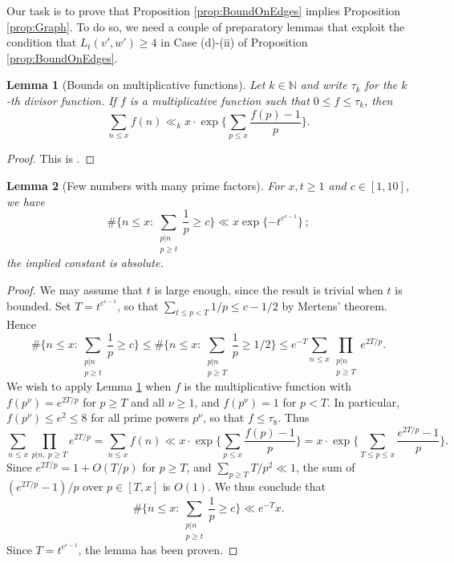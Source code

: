 \documentclass[12pt]{amsart}
\numberwithin{equation}{section}
\newtheorem{lem}{Lemma}[section]
\theoremstyle{definition}
\theoremstyle{remark}
\newcommand{\N}{\mathbb{N}}
\renewcommand{\le}{\leqslant}
\renewcommand{\ge}{\geqslant}
\begin{document}
Our task is to prove that Proposition \ref{prop:BoundOnEdges} implies Proposition \ref{prop:Graph}. To do so, we need a couple of preparatory lemmas that exploit the condition that $L_t(v',w')
\ge4$ in Case (d)-(ii) of Proposition \ref{prop:BoundOnEdges}.



\begin{lem}[Bounds on multiplicative functions]\label{lem:Tenenbaum}
	Let $k\in\N$ and write $\tau_k$ for the $k$-th divisor function. If $f$ is a multiplicative function such that $0\le f\le \tau_k$, then
	\[
	\sum_{n\le x} f(n) \ll_k x \cdot \exp\Big\{\sum_{p\le x}\frac{f(p)-1}{p}\Big\} .
	\]
\end{lem}
\begin{proof}
This is \cite[Theorem 14.2, p. 145]{dk-book}.
\end{proof}


\begin{lem}[Few numbers with many prime factors]\label{lem:Anatomy}
	For $x,t\ge1$ and $c\in[1,10]$, we have
	\[
	\#\bigg\{n\le x: \sum_{\substack{p|n\\  p\ge t}}\frac{1}{p} \ge  c \bigg\} \ll x\exp\{ - t^{e^{c-1}}\}  \, ;
	\]
	the implied constant is absolute.
\end{lem}

\begin{proof} We may assume that $t$ is large enough, since the result is trivial when $t$ is bounded. Set $T=t^{e^{c-1}}$, so that $\sum_{t\le p<T}1/p \le c-1/2$ by Mertens' theorem. Hence 
	\begin{equation}
	\#\bigg\{n\le x:\sum_{\substack{p|n\\ p\ge t}}\frac{1}{p} \ge c \bigg\}	
	\le \#\bigg\{n\le x: \sum_{\substack{p|n\\ p\ge T}}\frac{1}{p}  \ge 1/2 \bigg\} 
	\le e^{-T} \sum_{n\le x} \prod_{\substack{p|n\\ p\ge T}} e^{2T/p}  .
	\label{eq:Rankin}
	\end{equation}
	We wish to apply Lemma \ref{lem:Tenenbaum} when $f$ is the multiplicative function with $f(p^\nu)=e^{2T/p}$ for $p\ge T$ and all $\nu\ge 1$, and $f(p^\nu)=1$ for $p<T$. In particular, $f(p^\nu)\le e^2\le 8$ for all prime powers $p^\nu$, so that $f\le \tau_8$. Thus 
	\[
	\sum_{n\le x} \prod_{p|n,\ p\ge T} e^{2T/p}  
	= \sum_{n\le x} f(n) 
	\ll x \cdot \exp\Big\{\sum_{p\le x} \frac{f(p)-1}{p}\Big\} 
	=  x \cdot \exp\Big\{\sum_{T\le p\le x} \frac{e^{2T/p}-1}{p}\Big\} .
	\]
Since $e^{2T/p}=1+O(T/p)$ for $p\ge T$, and $\sum_{p\ge T} T/p^2\ll1$, the sum of $(e^{2T/p}-1)/p$ over $p\in[T,x]$ is $O(1)$. We thus conclude that
	\[
	\#\Big\{n\le x:\sum_{\substack{p|n\\ p\ge t}}\frac{1}{p} \ge c \Big\}\ll e^{-T}x.
	\]
Since $T=t^{e^{c-1}}$, the lemma has been proven.
\end{proof}
\end{document}
